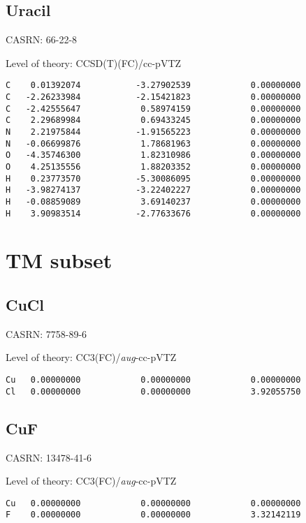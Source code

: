 \documentclass[journal=jctcce,manuscript=article,layout=traditional]{achemso}
\newcommand{\TZ}{cc-pVTZ}
\newcommand{\AVTZ}{\emph{aug}-cc-pVTZ}
\begin{document}
\subsection{Uracil}

CASRN: 66-22-8

\begin{singlespace}
\noindent Level of theory: CCSD(T)(FC)/{\TZ}
\begin{verbatim}
C    0.01392074           -3.27902539            0.00000000
C   -2.26233984           -2.15421823            0.00000000
C   -2.42555647            0.58974159            0.00000000
C    2.29689984            0.69433245            0.00000000
N    2.21975844           -1.91565223            0.00000000
N   -0.06699876            1.78681963            0.00000000
O   -4.35746300            1.82310986            0.00000000
O    4.25135556            1.88203352            0.00000000
H    0.23773570           -5.30086095            0.00000000
H   -3.98274137           -3.22402227            0.00000000
H   -0.08859089            3.69140237            0.00000000
H    3.90983514           -2.77633676            0.00000000
\end{verbatim}
\end{singlespace}


\clearpage

\section{TM  subset}

\subsection{CuCl}

CASRN: 7758-89-6

\begin{singlespace}
\noindent Level of theory: CC3(FC)/{\AVTZ}
\begin{verbatim}
Cu   0.00000000            0.00000000            0.00000000
Cl   0.00000000            0.00000000            3.92055750
\end{verbatim}
\end{singlespace}

\subsection{CuF}

CASRN: 13478-41-6

\begin{singlespace}
\noindent Level of theory: CC3(FC)/{\AVTZ}
\begin{verbatim}
Cu   0.00000000            0.00000000            0.00000000
F    0.00000000            0.00000000            3.32142119
\end{verbatim}
\end{singlespace}
\end{document}
